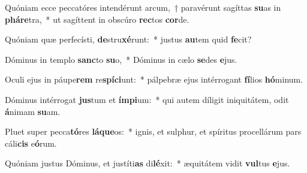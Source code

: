 \item Quóniam ecce peccatóres intendérunt arcum,~† paravérunt sagíttas \textbf{su}as in \textbf{phá}\textbf{re}tra,~* ut sagíttent in obscúro \textbf{rec}tos \textbf{cor}de.
\item Quóniam quæ perfecísti, \textbf{de}stru\textbf{xé}runt:~* justus \textbf{au}tem quid \textbf{fe}cit?
\item Dóminus in templo \textbf{sanc}to \textbf{su}o,~* Dóminus in cælo \textbf{se}des \textbf{e}jus.
\item Oculi ejus in páupe\textbf{rem} re\textbf{spí}\textbf{ci}unt:~* pálpebræ ejus intérrogant \textbf{fí}lios \textbf{hó}minum.
\item Dóminus intérrogat \textbf{jus}tum et \textbf{ím}\textbf{pi}um:~* qui autem díligit iniquitátem, odit \textbf{á}nimam \textbf{su}am.
\item Pluet super pecca\textbf{tó}res \textbf{lá}\textbf{que}os:~* ignis, et sulphur, et spíritus procellárum pars cáli\textbf{cis} e\textbf{ó}rum.
\item Quóniam justus Dóminus, et justíti\textbf{as} di\textbf{lé}xit:~* æquitátem vidit \textbf{vul}tus \textbf{e}jus.
